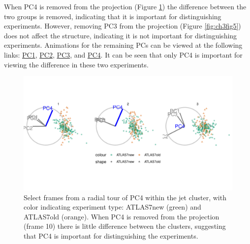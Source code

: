 \documentclass{monashthesis}
\begin{document}
When PC4 is removed from the projection (Figure \ref{fig:ch3fig4}) the difference between the two groups is removed, indicating that it is important for distinguishing experiments. However, removing PC3 from the projection (Figure \ref{fig:ch3fig5}) does not affect the structure, indicating it is not important for distinguishing experiments. Animations for the remaining PCs can be viewed at the following links: \href{https://github.com/nspyrison/spinifex_paper/blob/master/paper/gifs/jetcluster_manualtour_pc1.gif}{PC1}, \href{https://github.com/nspyrison/spinifex_paper/blob/master/paper/gifs/jetcluster_manualtour_pc2.gif}{PC2}, \href{https://github.com/nspyrison/spinifex_paper/blob/master/paper/gifs/jetcluster_manualtour_pc3.gif}{PC3}, and \href{https://github.com/nspyrison/spinifex_paper/blob/master/paper/gifs/jetcluster_manualtour_pc4.gif}{PC4}. It can be seen that only PC4 is important for viewing the difference in these two experiments.

\begin{figure}

{\centering \includegraphics[width=1\linewidth,]{./figures_from_script/ch3_fig4_jet_better_pc4} 

}

\caption{Select frames from a radial tour of PC4 within the jet cluster, with color indicating experiment type: ATLAS7new (green) and ATLAS7old (orange). When PC4 is removed from the projection (frame 10) there is little difference between the clusters, suggesting that PC4 is important for distinguishing the experiments.}\label{fig:ch3fig4}
\end{figure}
\end{document}
